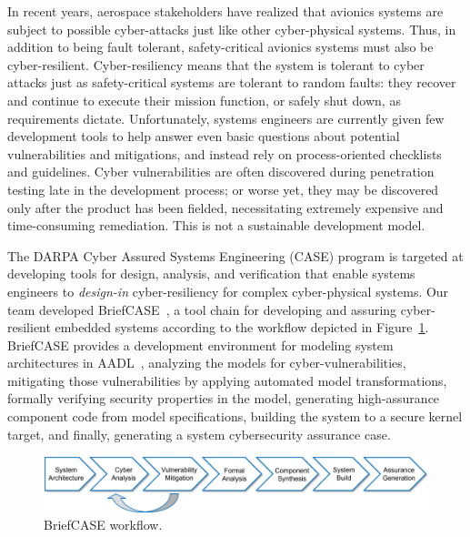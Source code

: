 


In recent years, aerospace stakeholders have realized that avionics systems are subject to possible cyber-attacks just like other cyber-physical systems. Thus, in addition to being fault tolerant, safety-critical avionics systems must also be cyber-resilient. Cyber-resiliency means that the system is tolerant to cyber attacks just as safety-critical systems are tolerant to random faults: they recover and continue to execute their mission function, or safely shut down, as requirements dictate. Unfortunately, systems engineers are currently given few development tools to help answer even basic questions about potential vulnerabilities and mitigations, and instead rely on process-oriented checklists and guidelines. Cyber vulnerabilities are often discovered during penetration testing late in the development process; or worse yet, they may be discovered only after the product has been fielded, necessitating extremely expensive and time-consuming remediation. This is not a sustainable development model. 

The DARPA Cyber Assured Systems Engineering (CASE) program is targeted at developing tools for design, analysis, and verification that enable systems engineers to \textit{design-in} cyber-resiliency for complex cyber-physical systems. 
%
Our team developed BriefCASE~\cite{case-at-scale}, a tool chain for developing and assuring cyber-resilient embedded systems according to the workflow depicted in Figure~\ref{fig:workflow}. BriefCASE provides a development environment for modeling system architectures in AADL~\cite{feiler-aadl}, analyzing the models for cyber-vulnerabilities, mitigating those vulnerabilities by applying automated model transformations, formally verifying security properties in the model, generating high-assurance component code from model specifications, building the system to a secure kernel target, and finally, generating a system cybersecurity assurance case.  

\begin{figure}[h] 
	\centering 
	\includegraphics[width=\textwidth]{figs/workflow.png}
	\caption{BriefCASE workflow.}
	\label{fig:workflow} 
\end{figure}

